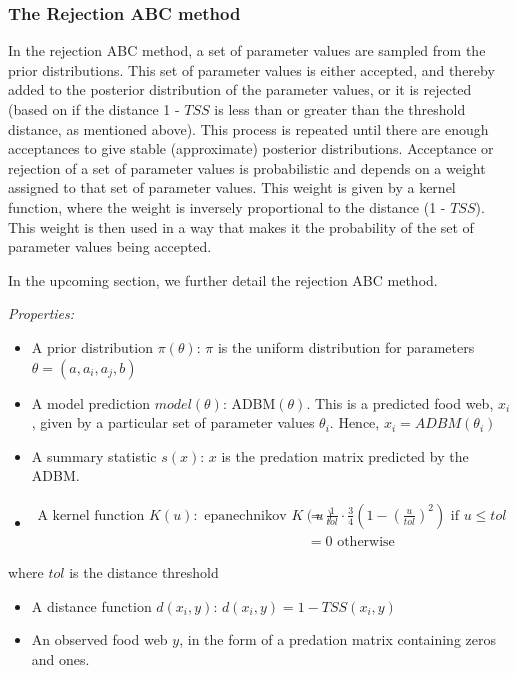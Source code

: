 \documentclass{article}
\begin{document}
\hypertarget{the-rejection-abc-method}{%
\subsubsection{The Rejection ABC
method}\label{the-rejection-abc-method}}

In the rejection ABC method, a set of parameter values are sampled from
the prior distributions. This set of parameter values is either
accepted, and thereby added to the posterior distribution of the
parameter values, or it is rejected (based on if the distance 1 -
\(TSS\) is less than or greater than the threshold distance, as
mentioned above). This process is repeated until there are enough
acceptances to give stable (approximate) posterior distributions.
Acceptance or rejection of a set of parameter values is probabilistic
and depends on a weight assigned to that set of parameter values. This
weight is given by a kernel function, where the weight is inversely
proportional to the distance (1 - \(TSS\)). This weight is then used in
a way that makes it the probability of the set of parameter values being
accepted.

In the upcoming section, we further detail the rejection ABC method.

\emph{Properties:}

\begin{itemize}
\item
  A prior distribution \(\pi(\theta)\): \(\pi\) is the uniform
  distribution for parameters \(\theta = (a, a_i, a_j, b)\)
\item
  A model prediction \(model(\theta)\): ADBM\((\theta)\). This is a
  predicted food web, \(x_i\), given by a particular set of parameter
  values \(\theta_i\). Hence, \(x_i = ADBM(\theta_i)\)
\item
  A summary statistic \(s(x)\): \(x\) is the predation matrix predicted
  by the ADBM.
\item
  \(\begin{aligned} \text{A kernel function } K(u): \text{ epanechnikov } K(u) &= \frac{1}{tol}\cdot\frac{3}{4}(1-(\frac{u}{tol})^2) \text{ if } u \leq tol \\ &= 0 \text{ otherwise} \end{aligned}\)
\end{itemize}

where \(tol\) is the distance threshold

\begin{itemize}
\item
  A distance function \(d(x_i,y)\): \(d(x_i,y) = 1 - TSS(x_i,y)\)
\item
  An observed food web \(y\), in the form of a predation matrix
  containing zeros and ones.
\end{itemize}
\end{document}

